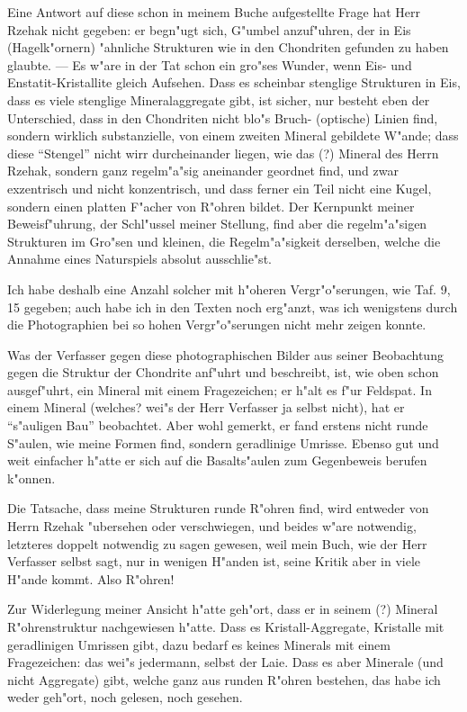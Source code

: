 \documentclass[a4paper, 12pt, oneside]{article}
\begin{document}
Eine Antwort auf diese schon in meinem Buche aufgestellte Frage hat Herr Rzehak nicht gegeben: er begn"ugt sich, G"umbel anzuf"uhren, der in Eis (Hagelk"ornern) "ahnliche Strukturen wie in den Chondriten gefunden zu haben glaubte. --- Es w"are in der Tat schon ein gro"ses Wunder, wenn Eis- und Enstatit-Kristallite gleich Aufsehen. Dass es scheinbar stenglige Strukturen in Eis, dass es viele stenglige Mineralaggregate gibt, ist sicher, nur besteht eben der Unterschied, dass in den Chondriten nicht blo"s Bruch- (optische) Linien find, sondern wirklich substanzielle, von einem zweiten Mineral gebildete W"ande; dass diese "`Stengel"' nicht wirr durcheinander liegen, wie das (?) Mineral des Herrn Rzehak, sondern ganz regelm"a"sig aneinander geordnet find, und zwar exzentrisch und nicht konzentrisch, und dass ferner ein Teil nicht eine Kugel, sondern einen platten F"acher von R"ohren bildet. Der Kernpunkt meiner Beweisf"uhrung, der Schl"ussel meiner Stellung, find aber die regelm"a"sigen Strukturen im Gro"sen und kleinen, die Regelm"a"sigkeit derselben, welche die Annahme eines Naturspiels absolut ausschlie"st.

Ich habe deshalb eine Anzahl solcher mit h"oheren Vergr"o"serungen, wie Taf. 9, 15 gegeben; auch habe ich in den Texten noch erg"anzt, was ich wenigstens durch die Photographien bei so hohen Vergr"o"serungen nicht mehr zeigen konnte.

Was der Verfasser gegen diese photographischen Bilder aus seiner Beobachtung gegen die Struktur der Chondrite anf"uhrt und beschreibt, ist, wie oben schon ausgef"uhrt, ein Mineral mit einem Fragezeichen; er h"alt es f"ur Feldspat. In einem Mineral (welches? wei"s der Herr Verfasser ja selbst nicht), hat er "`s"auligen Bau"' beobachtet. Aber wohl gemerkt, er fand erstens nicht runde S"aulen, wie meine Formen find, sondern geradlinige Umrisse. Ebenso gut und weit einfacher h"atte er sich auf die Basalts"aulen zum Gegenbeweis berufen k"onnen.

Die Tatsache, dass meine Strukturen runde R"ohren find, wird entweder von Herrn Rzehak "ubersehen oder verschwiegen, und beides w"are notwendig, letzteres doppelt notwendig zu sagen gewesen, weil mein Buch, wie der Herr Verfasser selbst sagt, nur in wenigen H"anden ist, seine Kritik aber in viele H"ande kommt. Also R"ohren!

Zur Widerlegung meiner Ansicht h"atte geh"ort, dass er in seinem (?) Mineral R"ohrenstruktur nachgewiesen h"atte. Dass es Kristall-Aggregate, Kristalle mit geradlinigen Umrissen gibt, dazu bedarf es keines Minerals mit einem Fragezeichen: das wei"s jedermann, selbst der Laie. Dass es aber Minerale (und nicht Aggregate) gibt, welche ganz aus runden R"ohren bestehen, das habe ich weder geh"ort, noch gelesen, noch gesehen.
\end{document}
